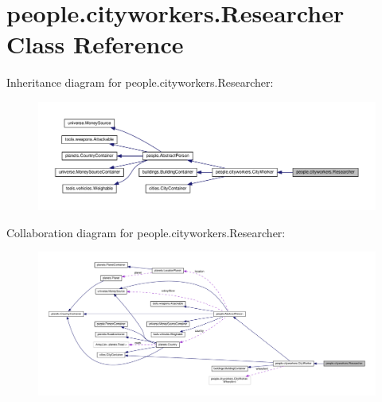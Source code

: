 \hypertarget{classpeople_1_1cityworkers_1_1_researcher}{}\section{people.\+cityworkers.\+Researcher Class Reference}
\label{classpeople_1_1cityworkers_1_1_researcher}


Inheritance diagram for people.\+cityworkers.\+Researcher\+:
\nopagebreak
\begin{figure}[H]
\begin{center}
\leavevmode
\includegraphics[width=350pt]{classpeople_1_1cityworkers_1_1_researcher__inherit__graph}
\end{center}
\end{figure}


Collaboration diagram for people.\+cityworkers.\+Researcher\+:
\nopagebreak
\begin{figure}[H]
\begin{center}
\leavevmode
\includegraphics[width=350pt]{classpeople_1_1cityworkers_1_1_researcher__coll__graph}
\end{center}
\end{figure}
